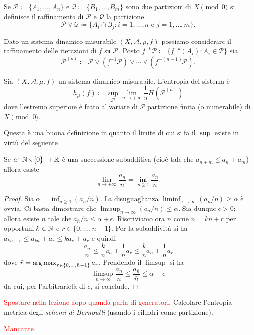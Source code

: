 \begin{definition}
    Se $ \mathcal{P} \coloneqq \{A_1, \ldots, A_n\} $ e $ \mathcal{Q} \coloneqq \{B_1, \ldots, B_m\} $ sono due partizioni di $ X \pmod{0} $ si definisce il raffinamento di $ \mathcal{P} $ e $ \mathcal{Q} $ la partizione
    \[
        \mathcal{P} \vee \mathcal{Q} \coloneqq \{A_i \cap B_j : i = 1, \ldots, n \text{ e } j = 1, \ldots, m\}.
    \]
\end{definition}

Dato un sistema dinamico misurabile $ (X, \mathcal{A}, \mu, f) $ possiamo considerare il raffinamento delle iterazioni di $ f $ su $ \mathcal{P} $. Posto $ f^{-k}\mathcal{P} \coloneqq \{f^{-k}(A_i) : A_i \in \mathcal{P}\} $ sia
\[
    \mathcal{P}^{(n)} \coloneqq \mathcal{P} \vee (f^{-1}\mathcal{P}) \vee \cdots \vee (f^{-(n-1)}\mathcal{P}).
\]

\begin{definition}
    Sia $ (X, \mathcal{A}, \mu, f) $ un sistema dinamico misurabile. L'entropia del sistema è
    \[
        h_\mu(f) \coloneqq \sup_\mathcal{P} {\lim_{n \to +\infty} \frac{1}{n}H(\mathcal{P}^{(n)})}
    \]
    dove l'estremo superiore è fatto al variare di $ \mathcal{P} $ partizione finita (o numerabile) di $ X \pmod{0} $.
\end{definition}
Questa è una buona definizione in quanto il limite di cui si fa il $ \sup $ esiste in virtù del seguente
\begin{lemma}[Fekete] \label{lem:fekete}
    Se $ a \colon \mathbb{N}\!\smallsetminus\!\{0\} \to \mathbb{R} $ è una successione subadditiva (cioè tale che $ a_{n+m} \leq a_n + a_m $) allora esiste
    \[
        \lim_{n\to+\infty} \frac{a_n}{n} = \inf_{n\geq1}\frac{a_n}{n}.
    \]
\end{lemma}
\begin{proof}
    Sia $ \alpha = \inf_{n\geq1} (a_n/n) $. La disuguaglianza $ \liminf_{n\to\infty} (a_n/n) \geq \alpha $ è ovvia. Ci basta dimostrare che $ \limsup_{n\to\infty} (a_n/n) \leq \alpha $. Sia dunque $ \epsilon > 0 $; allora esiste $ \bar{n} $ tale che $ a_{\bar{n}}/\bar{n} \leq \alpha + \epsilon $. Riscriviamo ora $ n $ come $ n = k \bar{n} + r $ per opportuni $ k\in\mathbb{N} $ e $ r\in\{0,\ldots, \bar{n}-1\} $. Per la subaddività si ha $ a_{k\bar{n}+r} \leq a_{k\bar{n}} + a_r \leq ka_{\bar{n}} + a_r $ e quindi
    \[ \frac{a_n}{n} \leq \frac{k}{n}a_{\bar{n}} + \frac{1}{n}a_r \leq \frac{k}{n}a_{\bar{n}} + \frac{1}{n} a_{\bar{r}} \]
    dove $ \bar{r} = \operatorname*{arg\, max}_{r\in\{ 0,\ldots, \bar{n}-1 \}} a_r $. Prendendo il $ \limsup $ si ha
    \[ \limsup_{n\to\infty} \frac{a_n}{n} \leq \frac{a_{\bar{n}}}{\bar{n}} \leq \alpha + \epsilon \]
    da cui, per l'arbitrarietà di $ \epsilon $, si conclude.
\end{proof}

\begin{exercise}
    \textcolor{red}{Spostare nella lezione dopo quando parla di generatori}.
    Calcolare l'entropia metrica degli \emph{schemi di Bernoulli} (usando i cilindri come partizione).
\end{exercise}
\begin{solution}
    \textcolor{red}{Mancante}
\end{solution}
